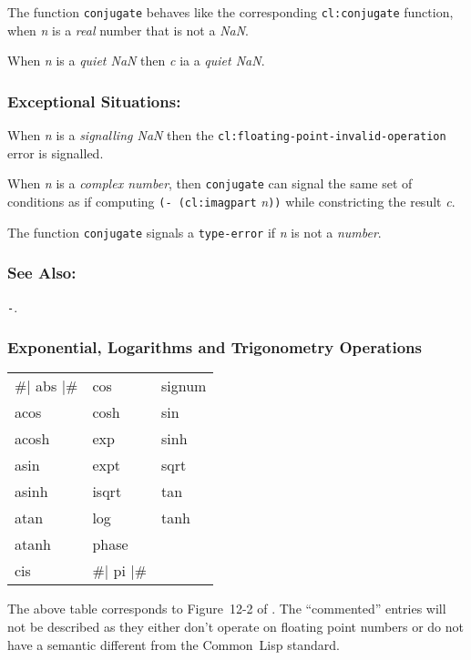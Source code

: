 \documentclass[10pt,fleqn]{article}
\newcommand{\CL}{\textsf{Common~Lisp}}
\newcommand{\code}[1]{\texttt{#1}}
\newcommand{\clieeeterm}[1]{\textit{#1}}
\newcommand{\varname}[1]{\textit{#1}}
\newcommand{\clterm}[1]{\textit{#1}}
\newcommand{\clname}[1]{\texttt{#1}}
\newcommand{\DExceptional}{\subsubsection*{Exceptional Situations:}}
\newcommand{\DSeeAlso}{\subsubsection*{See Also:}}
\begin{document}
The function \code{conjugate} behaves like the corresponding
\code{cl:conjugate} function, when \varname{n} is a \clterm{real}
number that is not a \clieeeterm{NaN}.

\noindent
When \varname{n} is a \clieeeterm{quiet NaN} then \varname{c} ia a
\clieeeterm{quiet NaN}.

\DExceptional{}

When \varname{n} is a \clieeeterm{signalling NaN} then the
\clname{cl:floating-point-invalid-operation} error is signalled.

When \varname{n} is a \clterm{complex number}, then \code{conjugate}
can signal the same set of conditions as if computing
\code{(- (cl:imagpart} \varname{n}\code{))} while constricting the result
\varname{c}.

The function \code{conjugate} signals a \code{type-error} if
\varname{n} is not a \clterm{number}.


\DSeeAlso{}

\code{-}.


\newpage

\subsubsection{Exponential, Logarithms and Trigonometry Operations}
\label{sect:transc-ops}

\begin{tt}
  \begin{tabular}{lll}
    \#| abs |\# & cos & signum\\
    acos &  cosh &  sin\\
    acosh & exp  &  sinh\\
    asin &  expt &  sqrt\\
    asinh & isqrt &  tan\\
    atan &  log &   tanh\\
    atanh & phase & \\
    cis & \#| pi |\# & \\
  \end{tabular}
\end{tt}

\vspace*{3mm}

\noindent
The above table corresponds to Figure~12-2 of \cite{1996:ANSIHyperSpec}.
The ``commented'' entries will not be described as they either don't
operate on floating point numbers or do not have a semantic different
from the \CL{} standard.
\end{document}
